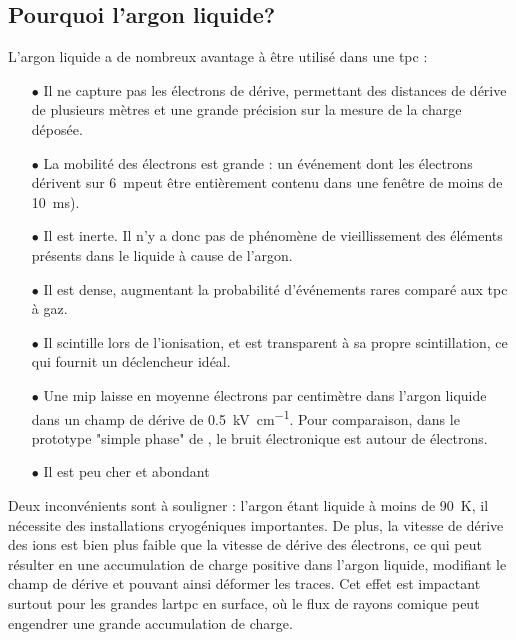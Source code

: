     \subsection{Pourquoi l'argon liquide?}
      L'argon liquide a de nombreux avantage à être utilisé dans une \gls{tpc}\cite{Rubbia1977} :
      \begin{itemize}
        \item[$\bullet$] Il ne capture pas les électrons de dérive, permettant des distances de dérive de plusieurs mètres et une grande précision sur la mesure de la charge déposée.
        \item[$\bullet$] La mobilité des électrons est grande : un événement dont les électrons dérivent sur \SI{6}{\meter}peut être entièrement contenu dans une fenêtre de moins de \SI{10}{\milli\second}).
        \item[$\bullet$] Il est inerte. Il n'y a donc pas de phénomène de vieillissement des éléments présents dans le liquide à cause de l'argon.
        \item[$\bullet$] Il est dense, augmentant la probabilité d'événements rares comparé aux \gls{tpc} à gaz.
        \item[$\bullet$] Il scintille lors de l'ionisation, et est transparent à sa propre scintillation, ce qui fournit un déclencheur idéal.
        \item[$\bullet$] Une \gls{mip} laisse en moyenne  électrons par centimètre dans l'argon liquide dans un champ de dérive de \SI{0.5}{\kilo\volt\per\centi\meter}. Pour comparaison, dans le prototype "simple phase" de \protosp{}, le bruit électronique est autour de  électrons.
        \item[$\bullet$] Il est peu cher et abondant
      \end{itemize}
      Deux inconvénients sont à souligner : l'argon étant liquide à moins de \SI{90}{\kelvin}, il nécessite des installations cryogéniques importantes. De plus, la vitesse de dérive des ions est bien plus faible que la vitesse de dérive des électrons, ce qui peut résulter en une accumulation de charge positive dans l'argon liquide, modifiant le champ de dérive et pouvant ainsi déformer les traces. Cet effet est impactant surtout pour les grandes \gls{lartpc} en surface, où le flux de rayons comique peut engendrer une grande accumulation de charge.
